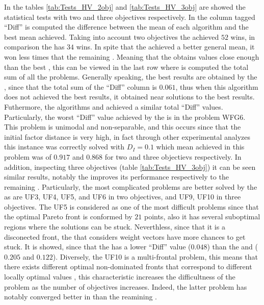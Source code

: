 In the tables \ref{tab:Tests_HV_2obj} and \ref{tab:Tests_HV_3obj} are showed the statistical tests with two and three objectives respectively.
%
In the column tagged ``Diff'' is computed the difference between the mean of each algorithm and the best mean achieved.
%
Taking into account two objectives the \VSDMOEA{} achieved $52$ wins, in comparison the \RMOEA{} has $34$ wins.
%
In spite that the \NSGAII{} achieved a better general mean, it won less times that the remaining \MOEAS{}.
%
Meaning that the \NSGAII{} obtains values close enough than the best \MOEA{}, this can be viewed in the last row where is computed the total sum of all the problems.
%
Generally speaking, the best results are obtained by the \VSDMOEA{}, since that the total sum of the ``Diff'' column is $0.061$, thus when this algorithm does not achieved the best results, it obtained near solutions to the best results.
%
Futhermore, the algorithms \RMOEA{} and \MOEAD{} achieved a similar total ``Diff'' values.
%
Particularly, the worst ``Diff'' value achieved by the \VSDMOEA{} is in the problem WFG6.
%
This problem is unimodal and non-separable, and this occurs since that the initial factor distance is very high, in fact through other experimental analyzes this instance was correctly solved with $D_I=0.1$ which mean achieved in this problem was of $0.917$ and $0.868$ for two and three objectievs respectively.
%
In addition, inspecting three objectives (table \ref{tab:Tests_HV_3obj}) it can be seen similar results, notably the \VSDMOEA{} improves its performance respectively to the remaining \MOEAS{}.
%
Particularly, the most complicated problems are better solved by the \VSDMOEA{} as are UF3, UF4, UF5, and UF6 in two objectives, and UF9, UF10 in three objectives.
%
The UF5 is considered as one of the most difficult problems since that the optimal Pareto front is conformed by $21$ points, also it has several suboptimal regions where the solutions can be stuck. 
%
Neverthless, since that it is a disconected front, the \MOEAS{} that considers weight vectors have more chances to get stuck.
%
It is showed, since that the \NSGAII{} has a lower ``Diff'' value ($0.048$) than the \MOEAD{} and \RMOEA{} ($0.205$ and $0.122$).
%
Diversely, the UF10 is a multi-frontal problem, this means that there exists different optimal non-dominated fronts that correspond to different locally optimal values \cite{huband2006review}, this characteristic increases the difficultness of the problem as the number of objectives increases.
%
Indeed, the latter problem has notably converged better in \VSDMOEA{} than the reamining \MOEAS{}.
%


